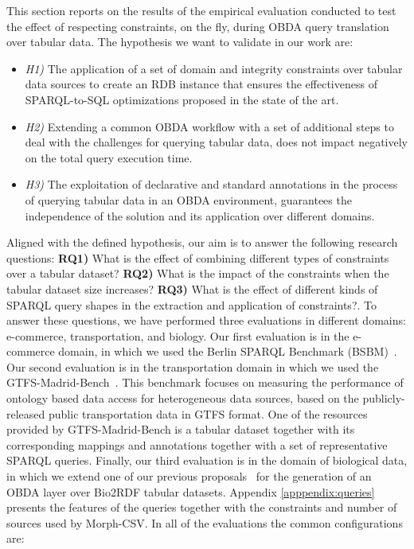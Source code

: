 This section reports on the results of the empirical evaluation conducted to test the effect of respecting constraints, on the fly, during OBDA query translation over tabular data. The hypothesis we want to validate in our work are:
\begin{itemize}
\item \textit{H1)} The application of a set of domain and integrity constraints over tabular data sources to create an RDB instance that ensures the effectiveness of SPARQL-to-SQL optimizations proposed in the state of the art.
\item \textit{H2)} Extending a common OBDA workflow with a set of additional steps to deal with the challenges for querying tabular data,  does not  impact negatively on the total query execution time.
\item \textit{H3)} The exploitation of declarative and standard annotations in the process of querying tabular data in an OBDA environment, guarantees the independence of the solution and its application over different domains.
\end{itemize}
Aligned with the defined hypothesis, our aim is to answer the following research questions: \textbf{RQ1)} What is the effect of combining different types of constraints over a tabular dataset? \textbf{RQ2)} What is the impact of the constraints when the tabular dataset size increases? \textbf{RQ3)} What is the effect of different kinds of SPARQL query shapes in the extraction and application of constraints?. To answer these questions, we have performed three evaluations in different domains: e-commerce, transportation, and biology. Our first evaluation is in the e-commerce domain, in which we used the Berlin SPARQL Benchmark (BSBM)~\citep{bizer2009berlin}. Our second evaluation is in the transportation domain in which we used the GTFS-Madrid-Bench~\citep{chaves2020gtfs}. This benchmark focuses on measuring the performance of ontology based data access for heterogeneous data sources, based on the publicly-released public transportation data in GTFS format. One of the resources provided by GTFS-Madrid-Bench is a tabular dataset together with its corresponding mappings and annotations together with a set of representative SPARQL queries. Finally, our third evaluation is in the domain of biological data, in which we extend one of our previous proposals~\citep{iglesias2019enhancing} for the generation of an OBDA layer over Bio2RDF tabular datasets. Appendix \ref{apppendix:queries} presents the features of the queries together with the constraints and number of sources used by Morph-CSV. In all of the evaluations the common configurations are:

